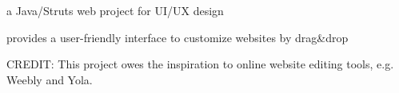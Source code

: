 \documentclass[]{deedy-resume-openfont}
\begin{document}
\begin{minipage}[t]{0.66\textwidth}
\begin{tightemize} 
\item a Java/Struts web project for UI/UX design
\item provides a user-friendly interface to customize websites by drag\&drop
\item CREDIT: This project owes the inspiration to online website editing tools, e.g. Weebly and Yola. 
\end{tightemize}
\sectionsep

\end{minipage} 
\end{document}
